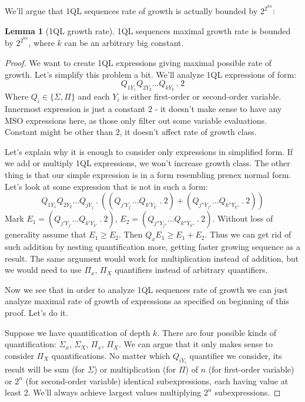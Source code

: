 \documentclass[12pt]{article}
\theoremstyle{definition}
\newtheorem{lemma}[theorem]{Lemma}
\begin{document}
We'll argue that 1QL sequences rate of growth is actually bounded by $2^{2^{kn}}$:

\begin{lemma}[1QL growth rate]
1QL sequences maximal growth rate is bounded by $2^{2^{kn}}$, where $k$ can be an arbitrary big constant.
\end{lemma}

\begin{proof}
We want to create 1QL expressions giving maximal possible rate of growth. Let's simplify this problem a bit. We'll analyze 1QL expressions of form:
$$Q_{1Y_1}Q_{2Y_2} \ldots Q_{kY_k} \ . \ 2$$
Where $Q_i \in \{ \Sigma, \Pi \}$ and each $Y_i$ is either first-order or second-order variable. Innermost expression is just a constant $2$ - it doesn't make sense to have any MSO expressions here, as those only filter out some variable evaluations. Constant might be other than $2$, it doesn't affect rate of growth class.

Let's explain why it is enough to consider only expressions in simplified form. If we add or multiply 1QL expressions, we won't increase growth class. The other thing is that our simple expression is in a form resembling prenex normal form. Let's look at some expression that is not in such a form:
$$Q_{1Y_1}Q_{2Y_2} \ldots Q_{jY_j} \ . \ ((Q_{j'Y_{j'}} \ldots Q_{k'Y_{k'}} \ . \ 2) + (Q_{j''Y_{j''}} \ldots Q_{k''Y_{k''}} \ . \ 2))$$
Mark $E_1 = (Q_{j'Y_{j'}} \ldots Q_{k'Y_{k'}} \ . \ 2)$, $E_2 = (Q_{j''Y_{j''}} \ldots Q_{k''Y_{k''}} \ . \ 2)$. Without loss of generality assume that $E_1 \geq E_2$. Then $Q_xE_1 \geq E_1 + E_2$. Thus we can get rid of such addition by nesting quantification more, getting faster growing sequence as a result. The same argument would work for multiplication instead of addition, but we would need to use $\Pi_x$, $\Pi_X$ quantifiers instead of arbitrary quantifiers.

Now we see that in order to analyze 1QL sequences rate of growth we can just analyze maximal rate of growth of expressions as specified on beginning of this proof. Let's do it.

Suppose we have quantification of depth $k$. There are four possible kinds of quantification: $\Sigma_x$, $\Sigma_X$, $\Pi_x$, $\Pi_X$. We can argue that it only makes sense to consider $\Pi_X$ quantifications. No matter which $Q_{iY_i}$ quantifier we consider, its result will be sum (for $\Sigma$) or multiplication (for $\Pi$) of $n$ (for first-order variable) or $2^n$ (for second-order variable) identical subexpressions, each having value at least 2. We'll always achieve largest values multiplying $2^n$ subexpressions. 


\end{proof}
\end{document}
